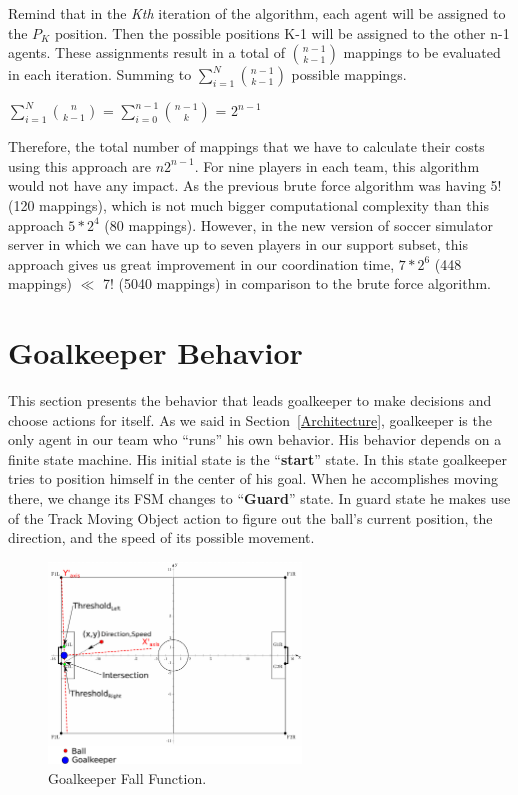 Remind that in the \textit{Kth} iteration of the algorithm, each agent will be assigned to the $P_{K}$ position. Then the possible positions K-1 will be assigned to the other n-1 agents. These assignments result in a total of $ {{n-1}\choose{k-1}} $ mappings to be evaluated in each iteration. Summing to $\sum\limits_{i=1}^N{{n-1}\choose{k-1}}$ possible mappings.\\
\begin{center}
$\sum\limits_{i=1}^N{{n}\choose{k-1}}$ = $\sum\limits_{i=0}^{n-1}{{n-1}\choose{k}}$ = $2^{n-1}$
\end{center}
Therefore, the total number of mappings that we have to calculate their costs using this approach are $n2^{n-1}$. For nine players in each team, this algorithm would not have any impact. As the previous brute force algorithm was having 5! (120 mappings), which is not much bigger computational complexity than this approach $5 \ast 2^{4}$ (80 mappings). However, in the new version of soccer simulator server in which we can have up to seven players in our support subset, this approach gives us great improvement in our coordination time, $7 \ast 2^{6}$ (448 mappings) $\ll$ 7! (5040 mappings) in comparison to the brute force algorithm.








\section{Goalkeeper Behavior}
\label{GoalKeeper}

This section presents the behavior that leads goalkeeper to make decisions and choose actions for itself. As we said in Section~\ref{Architecture}, goalkeeper is the only agent in our team who ``runs'' his own behavior. His behavior depends on a finite state machine. His initial state is the ``\textbf{start}'' state. In this state goalkeeper tries to position himself in the center of his goal. When he accomplishes moving there, we change its FSM changes to ``\textbf{Guard}'' state. In guard state he makes use of the Track Moving Object action to figure out the ball's current position, the direction, and the speed of its possible movement.

\begin{figure}[t!]
\centering
  \includegraphics[trim = 0cm 0cm 10cm 0cm, clip,width=0.6\textwidth]{Chapter3/figures/Goalie.pdf}  
  \caption{Goalkeeper Fall Function.}
  \label{fig:Goalkeeper}
\end{figure} 

